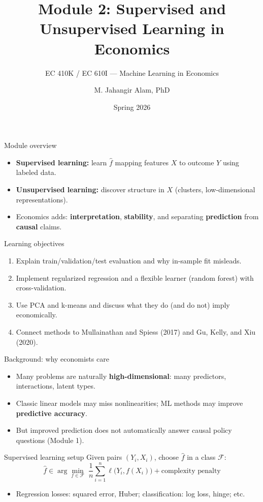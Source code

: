 \documentclass[aspectratio=169,11pt]{beamer}
\title[Supervised \& Unsupervised]{Module 2: Supervised and Unsupervised Learning in Economics}
\subtitle{EC 410K / EC 610I --- Machine Learning in Economics}
\author{M. Jahangir Alam, PhD}
\institute{Wilfrid Laurier University}
\date{Spring 2026}
\begin{document}
\begin{frame}[plain]
  \titlepage
\end{frame}

\begin{frame}{Module overview}
  \begin{itemize}
    \item \textbf{Supervised learning:} learn \(\widehat f\) mapping features \(X\) to outcome \(Y\) using labeled data.
    \item \textbf{Unsupervised learning:} discover structure in \(X\) (clusters, low-dimensional representations).
    \item Economics adds: \textbf{interpretation}, \textbf{stability}, and separating \textbf{prediction} from \textbf{causal} claims.
  \end{itemize}
\end{frame}

\begin{frame}{Learning objectives}
  \begin{enumerate}
    \item Explain train/validation/test evaluation and why in-sample fit misleads.
    \item Implement regularized regression and a flexible learner (random forest) with cross-validation.
    \item Use PCA and k-means and discuss what they do (and do not) imply economically.
    \item Connect methods to Mullainathan and Spiess (2017) and Gu, Kelly, and Xiu (2020).
  \end{enumerate}
\end{frame}

\begin{frame}{Background: why economists care}
  \begin{itemize}
    \item Many problems are naturally \textbf{high-dimensional}: many predictors, interactions, latent types.
    \item Classic linear models may miss nonlinearities; ML methods may improve \textbf{predictive accuracy}.
    \item But improved prediction does not automatically answer causal policy questions (Module 1).
  \end{itemize}
\end{frame}

\begin{frame}{Supervised learning setup}
  Given pairs \((Y_i, X_i)\), choose \(\widehat f\) in a class \(\mathcal{F}\):
  \[
    \widehat f \in \arg\min_{f \in \mathcal{F}} \;\frac{1}{n}\sum_{i=1}^n \ell\big(Y_i, f(X_i)\big) + \text{complexity penalty}
  \]
  \begin{itemize}
    \item Regression losses: squared error, Huber; classification: log loss, hinge; etc.
  \end{itemize}
\end{frame}
\end{document}
